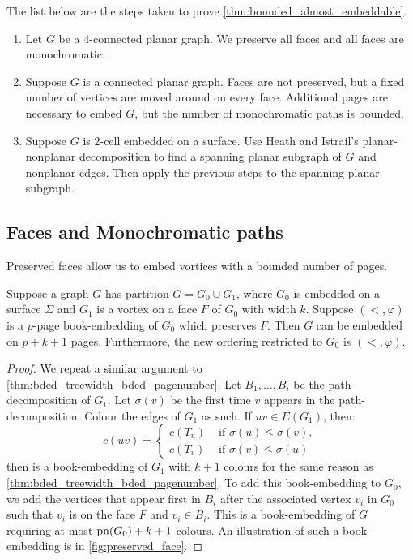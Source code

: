 The list below are the steps taken to prove \cref{thm:bounded_almost_embeddable}.
\begin{enumerate}
	\item Let $G$ be a \(4\)-connected planar graph. We preserve all faces and all faces are monochromatic.
	\item Suppose \(G\) is a connected planar graph. Faces are not preserved, but a fixed number of vertices are moved around on every face. Additional pages are necessary to embed $G$, but the number of monochromatic paths is bounded. 
	\item Suppose \(G\) is $2$-cell embedded on a surface. Use Heath and Istrail's \cite{heathPagenumberGenusGraphs1992} planar-nonplanar decomposition to find a spanning planar subgraph of $G$ and nonplanar edges. Then apply the previous steps to the spanning planar subgraph.
\end{enumerate}

\subsection{Faces and Monochromatic paths}

Preserved faces allow us to embed vortices with a bounded number of pages. 

\begin{lemma}\label{lem:preserved_faces_pagenumber}
	Suppose a graph \(G\) has partition \(G = G_0 \cup G_1\), where \(G_0\) is embedded on a surface $\Sigma$ and \(G_1\) is a vortex on a face $F$ of $G_0$ with width \(k\). Suppose $(<, \varphi)$ is a $p$-page book-embedding of \(G_0\) which preserves \(F\). Then $G$ can be embedded on \(p + k + 1\) pages. Furthermore, the new ordering restricted to $G_0$ is $(<, \varphi)$.
\end{lemma}

\begin{proof}
	We repeat a similar argument to \cref{thm:bded_treewidth_bded_pagenumber}. Let \(B_1, \ldots, B_i\) be the path-decomposition of \(G_1\). Let \(\sigma(v)\) be the first time \(v\) appears in the path-decomposition. Colour the edges of \(G_1\) as such. If \(uv \in E(G_1)\), then:
	\begin{equation}
		c(uv) =
		\begin{cases}
			c(T_u) & \text{ if } \sigma(u) \leq \sigma(v), \\
			c(T_v) & \text{ if } \sigma(v) \leq \sigma(u)
		\end{cases}
	\end{equation}
	then is a book-embedding of \(G_1\) with \(k+1\) colours for the same reason as \cref{thm:bded_treewidth_bded_pagenumber}.
	To add this book-embedding to \(G_0\), we add the vertices that appear first in \(B_i\) after the associated vertex \(v_i\) in \(G_0\) such that \(v_i\) is on the face \(F\) and \(v_i \in B_i\). This is a book-embedding of \(G\) requiring at most \(\operatorname{pn}(G_0) + k + 1\) colours. An illustration of such a book-embedding is in \cref{fig:preserved_face}.
\end{proof}

